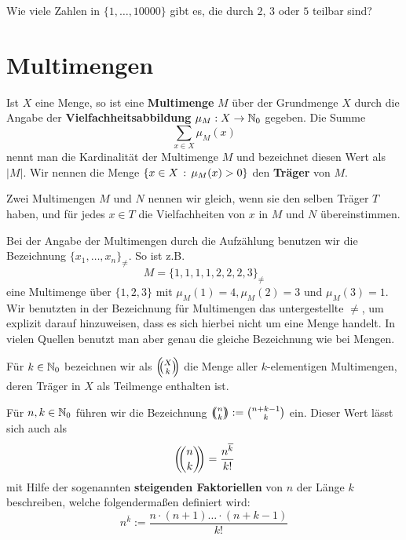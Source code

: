 \begin{aufg}
	Wie viele Zahlen in $\{1,\ldots,10000\}$ gibt es, die durch $2$, $3$ oder $5$ teilbar sind? 
\end{aufg} 

\section{Multimengen} 

\begin{defn}
Ist $X$ eine Menge, so ist eine \textbf{Multimenge} $M$ über der Grundmenge $X$ durch die Angabe der \textbf{Vielfachheitsabbildung} $\mu_M : X \to \mathbb{N}_0$ gegeben. Die Summe
\[
	\sum_{x \in X} \mu_M(x)
\]
nennt man die Kardinalität der Multimenge $M$ und bezeichnet diesen Wert als $|M|$.  Wir nennen die Menge $\left\{  x \in X \,:\, \mu_M(x)>0 \right\}$ den \textbf{Träger} von $M$.

Zwei Multimengen $M$ und $N$ nennen wir gleich, wenn sie den selben Träger $T$ haben, und für jedes $x \in T$ die Vielfachheiten von $x$ in $M$ und $N$ übereinstimmen.
\end{defn} 

\begin{bem}
	Bei der Angabe der Multimengen durch die Aufzählung benutzen wir die Bezeichnung $\{x_1,\ldots,x_n\}_{\ne}$. So ist z.B. 
	\[
			M = \{1,1,1,1,2,2,2,3\}_{\ne}
	\]
	eine Multimenge über $\{1,2,3\}$ mit $\mu_M(1) =4, \mu_M(2)=3$ und $\mu_M(3)=1$. Wir benutzten in der Bezeichnung für Multimengen das untergestellte $\ne$, um explizit darauf hinzuweisen, dass es sich hierbei nicht um eine Menge handelt. In vielen Quellen benutzt man aber genau die gleiche Bezeichnung wie bei Mengen. 
\end{bem}

\begin{defn}
	Für $k \in \mathbb{N}_0$ bezeichnen wir als $\left(\!\!\binom{X}{k}\!\!\right)$ die Menge aller $k$-elementigen Multimengen, deren Träger in  $X$ als Teilmenge enthalten ist. 
\end{defn} 

\begin{defn}
		Für $n,k \in \mathbb{N}_0$ führen wir die Bezeichnung $\left(\!\!\binom{n}{k}\!\!\right) := \binom{n+k-1}{k}$ ein. Dieser Wert lässt sich auch als 
		\[
			\left(\!\!\binom{n}{k}\!\!\right) =\frac{ n^{\overline{k}}}{k!}
		\]
		mit Hilfe der sogenannten \textbf{steigenden Faktoriellen} von $n$ der Länge $k$ beschreiben, welche folgendermaßen definiert wird: 
		\[
				n^{\overline{k}} := \frac{n \cdot (n+1) \ldots \cdot (n+k-1)}{k!}
		\]
		
\end{defn} 

